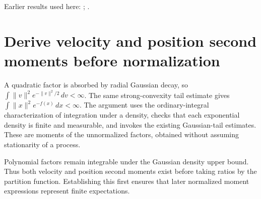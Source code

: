 \documentclass[11pt,a4paper]{article}
\begin{document}
Earlier results used here: \cite[Section~3.26.10]{LangevinLean2026ULASC}; \cite[Section~3.26.4]{LangevinLean2026ULASC}.

\section{\texorpdfstring{Derive velocity and position second moments before normalization}{Derive velocity and position second moments before normalization}}


A quadratic factor is absorbed by radial Gaussian decay, so \(\int\|v\|^2e^{-\|v\|^2/2}\,dv<\infty\). The same strong-convexity tail estimate gives \(\int\|x\|^2e^{-f(x)}\,dx<\infty\). The argument uses the ordinary-integral characterization of integration under a density, checks that each exponential density is finite and measurable, and invokes the existing Gaussian-tail estimates. These are moments of the unnormalized factors, obtained without assuming stationarity of a process.



Polynomial factors remain integrable under the Gaussian density upper bound. Thus both velocity and position second moments exist before taking ratios by the partition function. Establishing this first ensures that later normalized moment expressions represent finite expectations.
\end{document}
